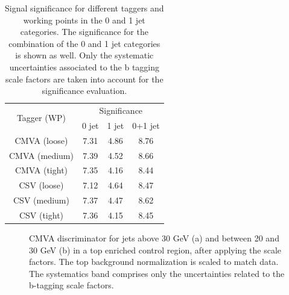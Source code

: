 \begin{table}[htb]
\caption{Signal significance for different taggers and working points in the 0 and 1 jet categories. The significance for the combination of the 0 and 1 jet categories is shown as well. Only the systematic uncertainties associated to the b tagging scale factors are taken into account for the significance evaluation.}
\centering
\begin{tabular}{|c|c|c|c|}
\hline
\multirow{2}{*}{Tagger (WP)} & \multicolumn{3}{c|}{Significance} \\
                        & 0 jet & 1 jet & 0+1 jet \\
\hline
CMVA (loose)     & 7.31 & 4.86 & 8.76 \\
CMVA (medium)    & 7.39 & 4.52 & 8.66 \\
CMVA (tight)     & 7.35 & 4.16 & 8.44 \\
\hline
CSV (loose)      & 7.12 & 4.64 & 8.47 \\
CSV (medium)     & 7.37 & 4.47 & 8.62 \\
CSV (tight)      & 7.36 & 4.15 & 8.45 \\
\hline
\end{tabular}
\label{btt}
\end{table}


\begin{figure}
\centering
{}
\caption{CMVA discriminator for jets above 30 GeV (a) and between 20 and 30 GeV (b) in a top enriched control region, after applying the scale factors. The top background normalization is scaled to match data. The systematics band comprises only the uncertainties related to the b-tagging scale factors.}
\label{cmvaT}
\end{figure}



